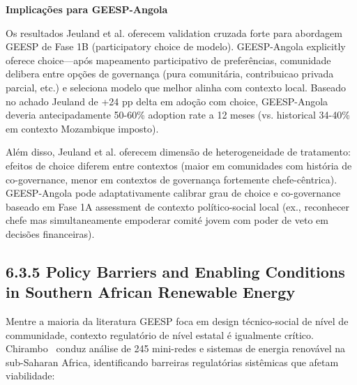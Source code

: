 \documentclass[12pt, a4paper]{article}
\begin{document}
\textbf{Implicações para GEESP-Angola}

Os resultados Jeuland et al. oferecem validation cruzada forte para abordagem GEESP de Fase 1B (participatory choice de modelo). GEESP-Angola explicitly oferece choice—após mapeamento participativo de preferências, comunidade delibera entre opções de governança (pura comunitária, contribuicao privada parcial, etc.) e seleciona modelo que melhor alinha com contexto local. Baseado no achado Jeuland de +24 pp delta em adoção com choice, GEESP-Angola deveria antecipadamente 50-60\% adoption rate a 12 meses (vs. historical 34-40\% em contexto Mozambique imposto).

Além disso, Jeuland et al. oferecem dimensão de heterogeneidade de tratamento: efeitos de choice diferem entre contextos (maior em comunidades com história de co-governance, menor em contextos de governança fortemente chefe-cêntrica). GEESP-Angola pode adaptativamente calibrar grau de choice e co-governance baseado em Fase 1A assessment de contexto político-social local (ex., reconhecer chefe mas simultaneamente empoderar comité jovem com poder de veto em decisões financeiras).

\subsection*{6.3.5 Policy Barriers and Enabling Conditions in Southern African Renewable Energy}

Mentre a maioria da literatura GEESP foca em design técnico-social de nível de communidade, contexto regulatório de nível estatal é igualmente crítico. Chirambo~\citep{Chirambo2018} conduz análise de 245 mini-redes e sistemas de energia renovável na sub-Saharan Africa, identificando barreiras regulatórias sistêmicas que afetam viabilidade:
\end{document}
